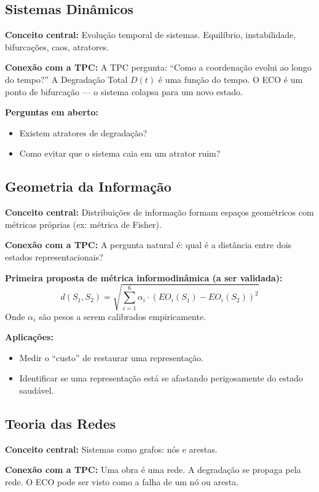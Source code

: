 \documentclass[12pt,a4paper]{article}
\begin{document}
\subsection{Sistemas Dinâmicos}

\textbf{Conceito central:} Evolução temporal de sistemas. Equilíbrio, instabilidade, bifurcações, caos, atratores.

\textbf{Conexão com a TPC:}
A TPC pergunta: ``Como a coordenação evolui ao longo do tempo?'' A Degradação Total \( D(t) \) é uma função do tempo. O ECO é um ponto de bifurcação — o sistema colapsa para um novo estado.

\textbf{Perguntas em aberto:}
\begin{itemize}
    \item Existem atratores de degradação?
    \item Como evitar que o sistema caia em um atrator ruim?
\end{itemize}

\subsection{Geometria da Informação}

\textbf{Conceito central:} Distribuições de informação formam espaços geométricos com métricas próprias (ex: métrica de Fisher).

\textbf{Conexão com a TPC:}
A pergunta natural é: qual é a distância entre dois estados representacionais?

\textbf{Primeira proposta de métrica informodinâmica (a ser validada):}
\[
d(S_1, S_2) = \sqrt{\sum_{i=1}^{6} \alpha_i \cdot (EO_i(S_1) - EO_i(S_2))^2}
\]
Onde \( \alpha_i \) são pesos a serem calibrados empiricamente.

\textbf{Aplicações:}
\begin{itemize}
    \item Medir o ``custo'' de restaurar uma representação.
    \item Identificar se uma representação está se afastando perigosamente do estado saudável.
\end{itemize}

\subsection{Teoria das Redes}

\textbf{Conceito central:} Sistemas como grafos: nós e arestas.

\textbf{Conexão com a TPC:}
Uma obra é uma rede. A degradação se propaga pela rede. O ECO pode ser visto como a falha de um nó ou aresta.
\end{document}
